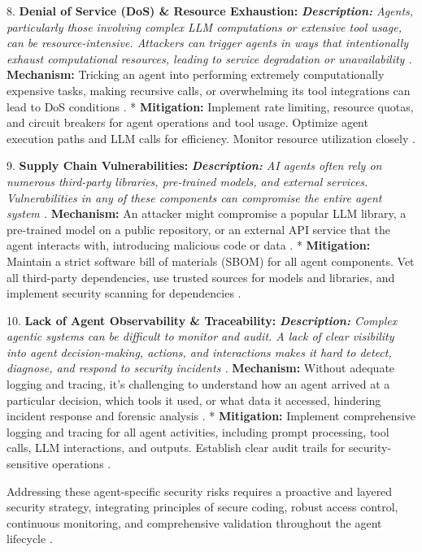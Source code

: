 8.  \textbf{Denial of Service (DoS) \& Resource Exhaustion:}     \textit{   \textbf{Description:} Agents, particularly those involving complex LLM computations or extensive tool usage, can be resource-intensive. Attackers can trigger agents in ways that intentionally exhaust computational resources, leading to service degradation or unavailability \cite{Reger2026}.     }   \textbf{Mechanism:} Tricking an agent into performing extremely computationally expensive tasks, making recursive calls, or overwhelming its tool integrations can lead to DoS conditions \cite{OWASP2026}.     *   \textbf{Mitigation:} Implement rate limiting, resource quotas, and circuit breakers for agent operations and tool usage. Optimize agent execution paths and LLM calls for efficiency. Monitor resource utilization closely \cite{Reger2026}.

9.  \textbf{Supply Chain Vulnerabilities:}     \textit{   \textbf{Description:} AI agents often rely on numerous third-party libraries, pre-trained models, and external services. Vulnerabilities in any of these components can compromise the entire agent system \cite{Reger2026}.     }   \textbf{Mechanism:} An attacker might compromise a popular LLM library, a pre-trained model on a public repository, or an external API service that the agent interacts with, introducing malicious code or data \cite{OWASP2026}.     *   \textbf{Mitigation:} Maintain a strict software bill of materials (SBOM) for all agent components. Vet all third-party dependencies, use trusted sources for models and libraries, and implement security scanning for dependencies \cite{Reger2026}.

10. \textbf{Lack of Agent Observability \& Traceability:}     \textit{   \textbf{Description:} Complex agentic systems can be difficult to monitor and audit. A lack of clear visibility into agent decision-making, actions, and interactions makes it hard to detect, diagnose, and respond to security incidents \cite{Reger2026}.     }   \textbf{Mechanism:} Without adequate logging and tracing, it's challenging to understand how an agent arrived at a particular decision, which tools it used, or what data it accessed, hindering incident response and forensic analysis \cite{OWASP2026}.     *   \textbf{Mitigation:} Implement comprehensive logging and tracing for all agent activities, including prompt processing, tool calls, LLM interactions, and outputs. Establish clear audit trails for security-sensitive operations \cite{Reger2026}.

Addressing these agent-specific security risks requires a proactive and layered security strategy, integrating principles of secure coding, robust access control, continuous monitoring, and comprehensive validation throughout the agent lifecycle \cite{Reger2026}.
